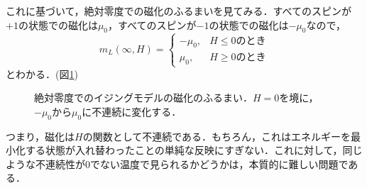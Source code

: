 \documentclass[a4paper,11pt]{jsreport}
\begin{document}
これに基づいて，絶対零度での磁化のふるまいを見てみる．すべてのスピンが$+1$の状態での磁化は$\mu_0$，すべてのスピンが$-1$の状態での磁化は$-\mu_0$なので，
\begin{equation}
  m_L(\infty, H) =
  \begin{cases}
    -\mu_0, & H \leq 0 \text{のとき} \\
    \mu_0,  & H \geq 0 \text{のとき}
  \end{cases}
\end{equation}
とわかる．(図\ref{絶対零度磁化})
\begin{figure}[h]
  \begin{center}
    \caption{絶対零度でのイジングモデルの磁化のふるまい．$H=0$を境に，$-\mu_0$から$\mu_0$に不連続に変化する．\label{絶対零度磁化}}
  \end{center}
\end{figure}
つまり，磁化は$H$の関数として不連続である．もちろん，これはエネルギーを最小化する状態が入れ替わったことの単純な反映にすぎない．これに対して，同じような不連続性が$0$でない温度で見られるかどうかは，本質的に難しい問題である．
\end{document}
